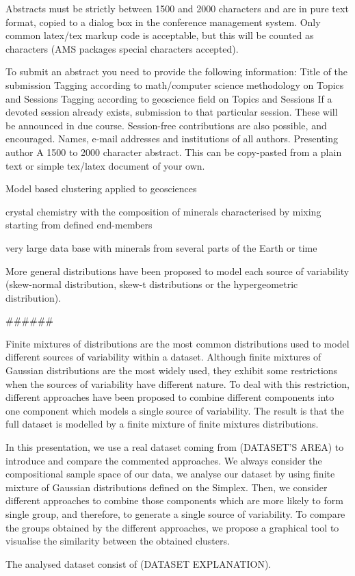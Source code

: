 Abstracts must be strictly between 1500 and 2000 characters and are in pure text format, copied to a dialog box in the conference management system. Only common latex/tex markup code is acceptable, but this will be counted as characters (AMS packages special characters accepted).

To submit an abstract you need to provide the following information:
Title of the submission
Tagging according to math/computer science methodology on Topics and Sessions
Tagging according to geoscience field on Topics and Sessions
If a devoted session already exists, submission to that particular session. These will be announced in due course. Session-free contributions are also possible, and encouraged.
Names, e-mail addresses and institutions of all authors.
Presenting author
A 1500 to 2000 character abstract. This can be copy-pasted from a plain text or simple tex/latex document of your own.


Model based clustering applied to geosciences

 crystal chemistry with the composition of minerals characterised by mixing starting from defined end-members

very large data base with minerals from several parts of the Earth or time

More general distributions have been proposed to model each source of variability (skew-normal distribution, skew-t distributions or the hypergeometric distribution).

######

Finite mixtures of distributions are the most common distributions used to model different sources of variability within a dataset. Although finite mixtures of Gaussian distributions are the most widely used, they exhibit some restrictions when the sources of variability have different nature. To deal with this restriction, different approaches have been proposed to combine different components into one component which models a single source of variability. The result is that the full dataset is modelled by a finite mixture of finite mixtures distributions.

In this presentation, we use a real dataset coming from (DATASET'S AREA) to introduce and compare the commented approaches. We always consider the compositional sample space of our data, we analyse our dataset by using finite mixture of Gaussian distributions defined on the Simplex. Then, we consider different approaches to combine those components which are more likely to form single group, and therefore, to generate a single source of variability. To compare the groups obtained by the different approaches, we propose a graphical tool to visualise the similarity between the obtained clusters.

The analysed dataset consist of (DATASET EXPLANATION).

